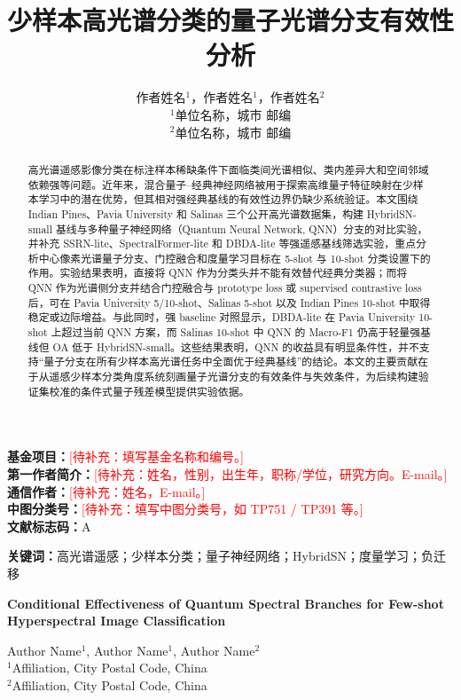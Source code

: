 \documentclass[UTF8,a4paper,zihao=-4,fontset=fandol]{ctexart}
\title{\heiti 少样本高光谱分类的量子光谱分支有效性分析}
\author{
作者姓名$^{1}$，作者姓名$^{1}$，作者姓名$^{2}$\\
\small $^{1}$单位名称，城市 邮编\\
\small $^{2}$单位名称，城市 邮编
}
\date{}
\newcommand{\todo}[1]{\textcolor{red}{[待补充：#1]}}
\begin{document}
\maketitle

\noindent\textbf{基金项目：}\todo{填写基金名称和编号。}\\
\textbf{第一作者简介：}\todo{姓名，性别，出生年，职称/学位，研究方向。E-mail。}\\
\textbf{通信作者：}\todo{姓名，E-mail。}\\
\textbf{中图分类号：}\todo{填写中图分类号，如 TP751 / TP391 等。}\\
\textbf{文献标志码：}A

\begin{abstract}
高光谱遥感影像分类在标注样本稀缺条件下面临类间光谱相似、类内差异大和空间邻域依赖强等问题。近年来，混合量子--经典神经网络被用于探索高维量子特征映射在少样本学习中的潜在优势，但其相对强经典基线的有效性边界仍缺少系统验证。本文围绕 Indian Pines、Pavia University 和 Salinas 三个公开高光谱数据集，构建 HybridSN-small 基线与多种量子神经网络（Quantum Neural Network, QNN）分支的对比实验，并补充 SSRN-lite、SpectralFormer-lite 和 DBDA-lite 等强遥感基线筛选实验，重点分析中心像素光谱量子分支、门控融合和度量学习目标在 5-shot 与 10-shot 分类设置下的作用。实验结果表明，直接将 QNN 作为分类头并不能有效替代经典分类器；而将 QNN 作为光谱侧分支并结合门控融合与 prototype loss 或 supervised contrastive loss 后，可在 Pavia University 5/10-shot、Salinas 5-shot 以及 Indian Pines 10-shot 中取得稳定或边际增益。与此同时，强 baseline 对照显示，DBDA-lite 在 Pavia University 10-shot 上超过当前 QNN 方案，而 Salinas 10-shot 中 QNN 的 Macro-F1 仍高于轻量强基线但 OA 低于 HybridSN-small。这些结果表明，QNN 的收益具有明显条件性，并不支持“量子分支在所有少样本高光谱任务中全面优于经典基线”的结论。本文的主要贡献在于从遥感少样本分类角度系统刻画量子光谱分支的有效条件与失效条件，为后续构建验证集校准的条件式量子残差模型提供实验依据。
\end{abstract}

\noindent\textbf{关键词：}高光谱遥感；少样本分类；量子神经网络；HybridSN；度量学习；负迁移

\vspace{1em}

\begin{center}
\textbf{\Large Conditional Effectiveness of Quantum Spectral Branches for Few-shot Hyperspectral Image Classification}
\end{center}

\begin{center}
Author Name$^{1}$, Author Name$^{1}$, Author Name$^{2}$\\
\small $^{1}$Affiliation, City Postal Code, China\\
\small $^{2}$Affiliation, City Postal Code, China
\end{center}
\end{document}
